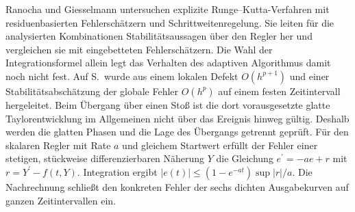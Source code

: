 Ranocha und Giesselmann untersuchen explizite Runge--Kutta-Verfahren mit residuenbasierten Fehlerschätzern und Schrittweitenregelung. Sie leiten für die analysierten Kombinationen Stabilitätsaussagen über den Regler her und vergleichen sie mit eingebetteten Fehlerschätzern. Die Wahl der Integrationsformel allein legt das Verhalten des adaptiven Algorithmus damit noch nicht fest.
Auf S.\, wurde aus einem lokalen Defekt \(O(h^{p+1})\) und einer Stabilitätsabschätzung der globale Fehler \(O(h^p)\) auf einem festen Zeitintervall hergeleitet. Beim Übergang über einen Stoß ist die dort vorausgesetzte glatte Taylorentwicklung im Allgemeinen nicht über das Ereignis hinweg gültig. Deshalb werden die glatten Phasen und die Lage des Übergangs getrennt geprüft.
Für den skalaren Regler mit Rate \(a\) und gleichem Startwert erfüllt der Fehler einer stetigen, stückweise differenzierbaren Näherung \(Y\) die Gleichung \(e^\prime=-ae+r\) mit \(r=Y^\prime-f(t,Y)\). Integration ergibt \(|e(t)|\le(1-e^{-at})\sup|r|/a\). Die Nachrechnung schließt den konkreten Fehler der sechs dichten Ausgabekurven auf ganzen Zeitintervallen ein.

